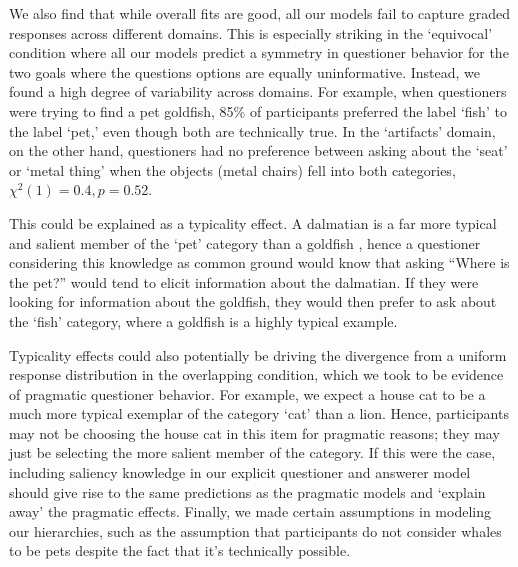 \documentclass[12pt, floatsintext, jou]{apa6}
\begin{document}
We also find that while overall fits are good, all our models fail to capture graded responses across different domains. This is especially striking in the `equivocal' condition where all our models predict a symmetry in questioner behavior for the two goals where the questions options are equally uninformative. Instead, we found a high degree of variability across domains. For example, when questioners were trying to find a pet goldfish, 85\% of participants preferred the label `fish' to the label `pet,' even though both are technically true. In the `artifacts' domain, on the other hand, questioners had no preference between asking about the `seat' or `metal thing' when the objects (metal chairs) fell into both categories, $\chi^2(1) = 0.4, p = 0.52$.%

This could be explained as a typicality effect. A dalmatian is a far more typical and salient member of the `pet' category than a goldfish \cite{Rosch75}, hence a questioner considering this knowledge as common ground would know that asking ``Where is the pet?'' would tend to elicit information about the dalmatian. If they were looking for information about the goldfish, they would then prefer to ask about the `fish' category, where a goldfish is a highly typical example. 

Typicality effects could also potentially be driving the divergence from a uniform response distribution in the overlapping condition, which we took to be evidence of pragmatic questioner behavior. For example, we expect a house cat to be a much more typical exemplar of the category `cat' than a lion. Hence, participants may not be choosing the house cat in this item for pragmatic reasons; they may just be selecting the more salient member of the category. If this were the case, including saliency knowledge in our explicit questioner and answerer model should give rise to the same predictions as the pragmatic models and `explain away' the pragmatic effects. Finally, we made certain assumptions in modeling our hierarchies, such as the assumption that participants do not consider whales to be pets despite the fact that it's technically possible. 
\end{document}
